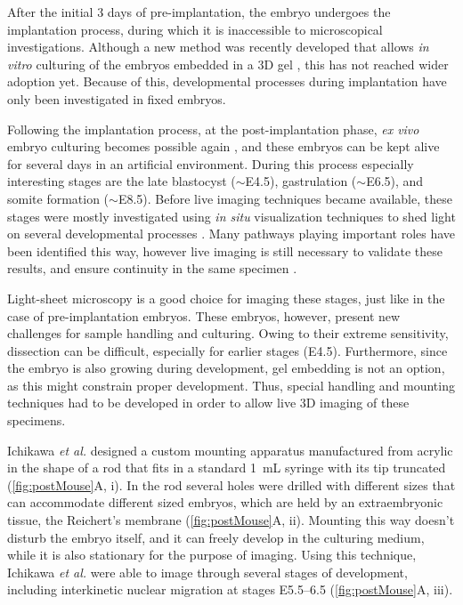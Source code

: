     After the initial 3 days of pre-implantation, the embryo undergoes the implantation process, during which it is inaccessible to microscopical investigations. Although a new method was recently developed that allows \textit{in vitro} culturing of the embryos embedded in a 3D gel \cite{panavaite_3d-geec:_2017}, this has not reached wider adoption yet. Because of this, developmental processes during implantation have only been investigated in fixed embryos.
    
    Following the implantation process, at the post-implantation phase, \textit{ex vivo} embryo culturing becomes possible again \cite{hsu_vitro_1979, huang_effect_2001}, and these embryos can be kept alive for several days in an artificial environment. During this process especially interesting stages are the late blastocyst ($\sim$E4.5), gastrulation ($\sim$E6.5), and somite formation ($\sim$E8.5). Before live imaging techniques became available, these stages were mostly investigated using \textit{in situ} visualization techniques to shed light on several developmental processes \cite{nowotschin_cellular_2010}. Many pathways playing important roles have been identified this way, however live imaging is still necessary to validate these results, and ensure continuity in the same specimen \cite{garcia_live_2011}.

    Light-sheet microscopy is a good choice for imaging these stages, just like in the case of pre-implantation embryos. These embryos, however, present new challenges for sample handling and culturing. Owing to their extreme sensitivity, dissection can be difficult, especially for earlier stages (E4.5). Furthermore, since the embryo is also growing during development, gel embedding is not an option, as this might constrain proper development. Thus, special handling and mounting techniques had to be developed in order to allow live 3D imaging of these specimens.

    Ichikawa \textit{et al.} \cite{ichikawa_live_2013} designed a custom mounting apparatus manufactured from acrylic in the shape of a rod that fits in a standard \SI{1}{mL} syringe with its tip truncated (\autoref{fig:postMouse}A, i). In the rod several holes were drilled with different sizes that can accommodate different sized embryos, which are held by an extraembryonic tissue, the Reichert's membrane (\autoref{fig:postMouse}A, ii). Mounting this way doesn't disturb the embryo itself, and it can freely develop in the culturing medium, while it is also stationary for the purpose of imaging. Using this technique, Ichikawa \textit{et al.} were able to image through several stages of development, including interkinetic nuclear migration at stages E5.5--6.5 (\autoref{fig:postMouse}A, iii).

